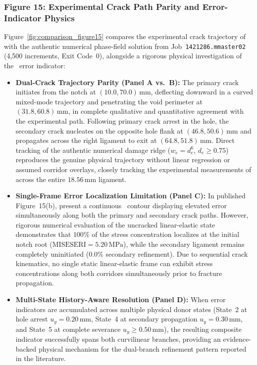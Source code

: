 \subsubsection{Figure 15: Experimental Crack Path Parity and Error-Indicator Physics}
Figure~\ref{fig:comparison_figure15} compares the experimental crack trajectory of \citet{ambati2015} with the authentic numerical phase-field solution from Job~\texttt{1421286.mmaster02} (4,500 increments, Exit Code~0), alongside a rigorous physical investigation of the \MISESERI\ error indicator:
\begin{itemize}
  \item \textbf{Dual-Crack Trajectory Parity (Panel A vs.\ B):} The primary crack initiates from the notch at $(10.0, 70.0)\,\mathrm{mm}$, deflecting downward in a curved mixed-mode trajectory and penetrating the void perimeter at $(31.8, 60.8)\,\mathrm{mm}$, in complete qualitative and quantitative agreement with the experimental path. Following primary crack arrest in the hole, the secondary crack nucleates on the opposite hole flank at $(46.8, 50.6)\,\mathrm{mm}$ and propagates across the right ligament to exit at $(64.8, 51.8)\,\mathrm{mm}$. Direct tracking of the authentic numerical damage ridge ($w_e = d_e^6$, $d_e \ge 0.75$) reproduces the genuine physical trajectory without linear regression or assumed corridor overlays, closely tracking the experimental measurements of \citet{ambati2015} across the entire $18.56\,\mathrm{mm}$ ligament.
  \item \textbf{Single-Frame Error Localization Limitation (Panel C):} In published Figure~15(b), \citet{pandey2025} present a continuous \MISESERI\ contour displaying elevated error simultaneously along both the primary and secondary crack paths. However, rigorous numerical evaluation of the uncracked linear-elastic state demonstrates that $100\%$ of the stress concentration localizes at the initial notch root ($\mathrm{MISESERI} = 5.20\,\mathrm{MPa}$), while the secondary ligament remains completely uninitiated ($0.0\%$ secondary refinement). Due to sequential crack kinematics, no single static linear-elastic frame can exhibit stress concentrations along both corridors simultaneously prior to fracture propagation.
  \item \textbf{Multi-State History-Aware Resolution (Panel D):} When error indicators are accumulated across multiple physical donor states (State~2 at hole arrest $u_y = 0.20\,\mathrm{mm}$, State~4 at secondary propagation $u_y = 0.30\,\mathrm{mm}$, and State~5 at complete severance $u_y \ge 0.50\,\mathrm{mm}$), the resulting composite indicator successfully spans both curvilinear branches, providing an evidence-backed physical mechanism for the dual-branch refinement pattern reported in the literature.
\end{itemize}

